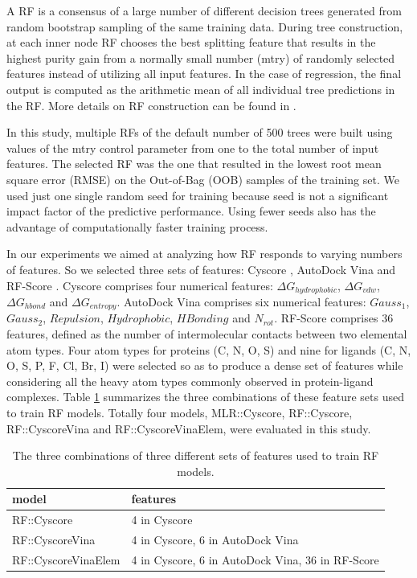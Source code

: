 A RF \citep{1309} is a consensus of a large number of different decision trees generated from random bootstrap sampling of the same training data. During tree construction, at each inner node RF chooses the best splitting feature that results in the highest purity gain from a normally small number (mtry) of randomly selected features instead of utilizing all input features. In the case of regression, the final output is computed as the arithmetic mean of all individual tree predictions in the RF. More details on RF construction can be found in \citep{564,1362}.

In this study, multiple RFs of the default number of 500 trees were built using values of the mtry control parameter from one to the total number of input features. The selected RF was the one that resulted in the lowest root mean square error (RMSE) on the Out-of-Bag (OOB) samples of the training set. We used just one single random seed for training because seed is not a significant impact factor of the predictive performance. Using fewer seeds also has the advantage of computationally faster training process.

In our experiments we aimed at analyzing how RF responds to varying numbers of features. So we selected three sets of features: Cyscore \citep{1372}, AutoDock Vina \citep{595} and RF-Score \citep{564}. Cyscore comprises four numerical features: $\Delta G_{hydrophobic}$, $\Delta G_{vdw}$, $\Delta G_{hbond}$ and $\Delta G_{entropy}$. AutoDock Vina comprises six numerical features: $Gauss_1$, $Gauss_2$, $Repulsion$, $Hydrophobic$, $HBonding$ and $N_{rot}$. RF-Score comprises 36 features, defined as the number of intermolecular contacts between two elemental atom types. Four atom types for proteins (C, N, O, S) and nine for ligands (C, N, O, S, P, F, Cl, Br, I) were selected so as to produce a dense set of features while considering all the heavy atom types commonly observed in protein-ligand complexes. Table \ref{rfcyscore:features} summarizes the three combinations of these feature sets used to train RF models. Totally four models, MLR::Cyscore, RF::Cyscore, RF::CyscoreVina and RF::CyscoreVinaElem, were evaluated in this study.

\begin{table}
\caption{The three combinations of three different sets of features used to train RF models.}
\label{rfcyscore:features}
\begin{tabular}{ll}
\hline
model & features\\
\hline
RF::Cyscore         & 4 in Cyscore\\
RF::CyscoreVina     & 4 in Cyscore, 6 in AutoDock Vina\\
RF::CyscoreVinaElem & 4 in Cyscore, 6 in AutoDock Vina, 36 in RF-Score\\
\hline
\end{tabular}
\end{table}

